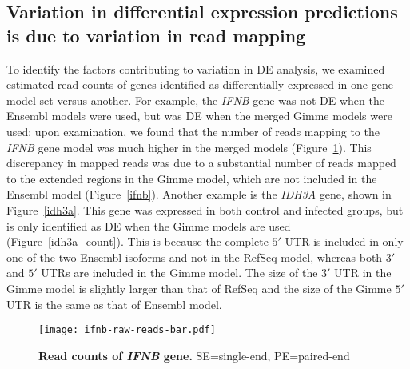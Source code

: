 \subsection{Variation in differential expression predictions is due to
variation in read mapping}

To identify the factors contributing to variation in DE
analysis, we examined estimated read counts of genes
identified as differentially expressed in one gene model set
versus another.  For example, the {\em IFNB} gene was not DE
when the Ensembl models were used, but was DE when the
merged Gimme models were used; upon examination, we found
that the number of reads mapping to the {\em IFNB} gene
model was much higher in the merged models
(Figure~\ref{ifnb_count}).  This discrepancy in mapped reads
was due to a substantial number of reads mapped to the
extended regions in the Gimme model, which are not included
in the Ensembl model (Figure~\ref{ifnb}).  Another example
is the {\em IDH3A} gene, shown in Figure~\ref{idh3a}. This
gene was expressed in both control and infected groups, but
is only identified as DE when the Gimme models are used
(Figure~\ref{idh3a_count}).  This is because the complete
$5\prime$ UTR is included in only one of the two Ensembl
isoforms and not in the RefSeq model, whereas both $3\prime$
and $5\prime$ UTRs are included in the Gimme model.  The
size of the $3\prime$ UTR in the Gimme model is slightly
larger than that of RefSeq and the size of the Gimme
$5\prime$ UTR is the same as that of Ensembl model.

\begin{figure}[!ht]
    \begin{center}
        \texttt{[image: ifnb-raw-reads-bar.pdf]}
    \end{center}
    \caption{
        \textbf{Read counts of {\em IFNB} gene.} SE=single-end, PE=paired-end
    }
    \label{ifnb_count}
\end{figure}

